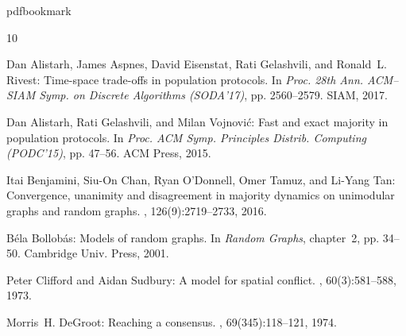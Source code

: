 \documentclass[11pt]{article}
\numberwithin{equation}{section}
\theoremstyle{definition}
\theoremstyle{plain}
\begin{document}
			

\newcommand{\prelim}{Preliminary version in\ }\newcommand{\prelims}{Preliminary
  versions in\ }
\providecommand{\bibhead}[1]{}
\expandafter\ifx\csname pdfbookmark\endcsname\relax%
  \providecommand{\tocrefpdfbookmark}{}
\else\providecommand{\tocrefpdfbookmark}{%
   \hypertarget{tocreferences}{}%
   \pdfbookmark[1]{References}{tocreferences}}%
\fi

\tocrefpdfbookmark
\begin{thebibliography}{10}

\bibhead{alistarh2017}
{\sc Dan Alistarh, James Aspnes, David Eisenstat, Rati Gelashvili, and
  Ronald~L. Rivest}: Time-space trade-offs in population protocols.
\newblock In {\em Proc. 28th Ann. ACM--SIAM Symp. on Discrete Algorithms
  (SODA'17)}, pp. 2560--2579. SIAM, 2017.

\bibhead{alistarh2015}
{\sc Dan Alistarh, Rati Gelashvili, and Milan Vojnovi\'{c}}: Fast and exact
  majority in population protocols.
\newblock In {\em Proc. ACM Symp. Principles Distrib. Computing (PODC'15)}, pp.
  47--56. ACM Press, 2015.
\newblock [\epfmtdoi{10.1145/2767386.2767429}]

\bibhead{benjamini}
{\sc Itai Benjamini, Siu-On Chan, Ryan O’Donnell, Omer Tamuz, and Li-Yang
  Tan}: Convergence, unanimity and disagreement in majority dynamics on
  unimodular graphs and random graphs.
, 126(9):2719--2733, 2016.

\bibhead{Bollobasbook}
{\sc B{\'e}la Bollob{\'a}s}: Models of random graphs.
\newblock In {\em Random Graphs}, chapter~2, pp. 34--50. Cambridge Univ. Press,
  2001.

\bibhead{clifford1973}
{\sc Peter Clifford and Aidan Sudbury}: A model for spatial conflict.
, 60(3):581--588, 1973.

\bibhead{degroot1974}
{\sc Morris~H. DeGroot}: Reaching a consensus.
, 69(345):118--121, 1974.
\newblock [\epfmtdoi{10.2307/2285509}]


\end{thebibliography}
\end{document}
